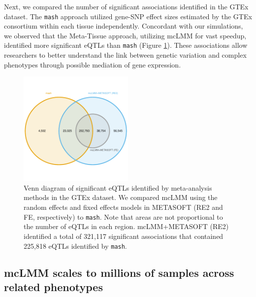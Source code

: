         Next, we compared the number of significant associations identified in the GTEx dataset. The \texttt{mash} approach utilized gene-SNP effect sizes estimated by the GTEx consortium within each tissue independently. Concordant with our simulations, we observed that the Meta-Tissue approach, utilizing mcLMM for vast speedup, identified more significant eQTLs than \texttt{mash} (Figure \ref{fig:fig3.5}). These associations allow researchers to better understand the link between genetic variation and complex phenotypes through possible mediation of gene expression. 
        
        \begin{figure}
            \centering
            \includegraphics[width=0.5\textwidth]{chapter3/figures/Figure_5.pdf}
            \caption{Venn diagram of significant eQTLs identified by meta-analysis methods in the GTEx dataset. We compared mcLMM using the random effects and fixed effects models in METASOFT (RE2 and FE, respectively) to \texttt{mash}. Note that areas are not proportional to the number of eQTLs in each region. mcLMM+METASOFT (RE2) identified a total of 321,117 significant associations that contained 225,818 eQTLs identified by \texttt{mash}.}
            \label{fig:fig3.5}
        \end{figure}
        
    \subsection{mcLMM scales to millions of samples across related phenotypes}
    
